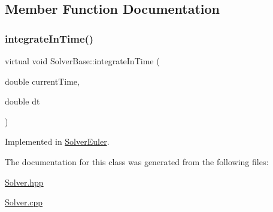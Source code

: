 \subsection{Member Function Documentation}
\mbox{\label{class_solver_base_a14b5e9482f698d36dff3b43d3a4f05f1}} 
\subsubsection{\texorpdfstring{integrate\+In\+Time()}{integrateInTime()}}
{\footnotesize\ttfamily virtual void Solver\+Base\+::integrate\+In\+Time (\begin{DoxyParamCaption}\item[{double}]{current\+Time,  }\item[{double}]{dt }\end{DoxyParamCaption})\hspace{0.3cm}{\ttfamily [pure virtual]}}



Implemented in \mbox{\hyperlink{class_solver_euler_a64caa7276a35f9e5408bec75bc2d3189}{Solver\+Euler}}.



The documentation for this class was generated from the following files\+:\begin{DoxyCompactItemize}
\item 
\mbox{\hyperlink{_solver_8hpp}{Solver.\+hpp}}\item 
\mbox{\hyperlink{_solver_8cpp}{Solver.\+cpp}}\end{DoxyCompactItemize}

